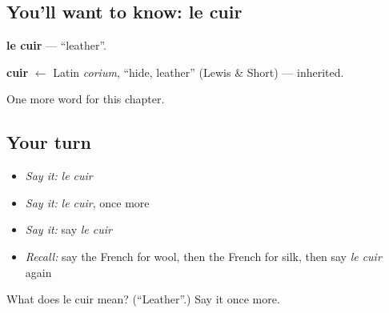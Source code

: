 \subsection*{You'll want to know: le cuir}
\textbf{le cuir} — \textquotedblleft{}leather\textquotedblright{}.

\begin{cousinweb}
\textbf{cuir} $\leftarrow$ Latin \emph{corium}, \textquotedblleft{}hide, leather\textquotedblright{} (Lewis \& Short) — inherited.
\end{cousinweb}

\begin{grammarlens}[title={What you've built}]
One more word for this chapter.
\end{grammarlens}

\subsection*{Your turn}
\begin{itemize}
\raggedright
  \item \emph{Say it:} \emph{le cuir}
  \item \emph{Say it:} \emph{le cuir}, once more
  \item \emph{Say it:} say \emph{le cuir}
  \item \emph{Recall:} say the French for wool, then the French for silk, then say \emph{le cuir} again
\end{itemize}

\begin{tcolorbox}[breakable,colback=teal!4,colframe=teal!35!black,title={Before you move on}]
What does le cuir mean? (\textquotedblleft{}Leather\textquotedblright{}.) Say it once more.
\end{tcolorbox}
